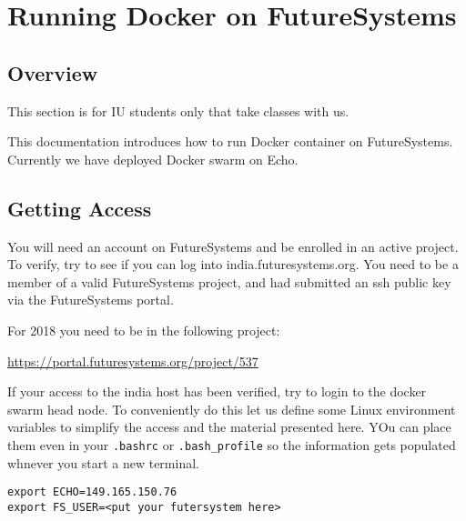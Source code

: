 
\chapter{Running Docker on FutureSystems}\label{S:docker-fg}

\FILENAME

\section{Overview}

\begin{IU}

This section is for IU students only that take classes with us.
\end{IU}

This documentation introduces how to run Docker container on
FutureSystems. Currently we have deployed Docker swarm on Echo.

\section{Getting Access}

You will need an account on FutureSystems and be enrolled in an active
project.  To verify, try to see if you can log into
india.futuresystems.org. You need to be a member of a valid
FutureSystems project, and had submitted an ssh public key via the
FutureSystems portal.

\begin{IU}
For 2018 you need to be in the following project:

\url{https://portal.futuresystems.org/project/537}

\end{IU}

If your access to the india host has been verified, try to login to
the docker swarm head node. To conveniently do this let us define some
Linux environment variables to simplify the access and the material
presented here. YOu can place them even in your \verb|.bashrc| or
\verb|.bash_profile| so the information gets populated whnever you start a
new terminal.

\begin{lstlisting}
export ECHO=149.165.150.76
export FS_USER=<put your futersystem here>
\end{lstlisting}


